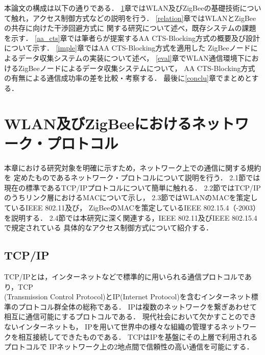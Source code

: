 \documentclass[12pt]{jreport}
\begin{document}
本論文の構成は以下の通りである．
\ref{fundamental}章ではWLAN及びZigBeeの基礎技術について触れ，アクセス制御方式などの説明を行う．
\ref{relation}章ではWLANとZigBeeの共存に向けた干渉回避方式に
関する研究について述べ，既存システムの課題を示す．
\ref{aa_cts}章では筆者らが提案するAA CTS-Blocking方式の概要及び設計について示す．
\ref{imple}章ではAA CTS-Blocking方式を適用した
ZigBeeノードによるデータ収集システムの実装について述べ，
\ref{eval}章でWLAN通信環境下におけるZigBeeノードによるデータ収集システムについて，
AA CTS-Blocking方式の有無による通信成功率の差を比較・考察する．
最後に\ref{conclu}章でまとめとする．

\chapter{WLAN及びZigBeeにおけるネットワーク・プロトコル}
\label{fundamental}
本章における研究対象を明確に示すため，ネットワーク上での通信に関する規約を
定めたものであるネットワーク・プロトコルについて説明を行う．
2.1節では現在の標準であるTCP/IPプロトコルについて簡単に触れる．
2.2節ではTCP/IPのうちリンク層におけるMACについて示し，
2.3節ではWLANのMACを策定しているIEEE 802.11及び，
ZigBeeのMACを策定しているIEEE 802.15.4（-2003）を説明する．
2.4節では本研究に深く関連する，IEEE 802.11及びIEEE 802.15.4で規定されている
具体的なアクセス制御方式について紹介する．\\

\section{TCP/IP}

TCP/IPとは，インターネットなどで標準的に用いられる通信プロトコルであり，TCP\\
(Transmission Control Protocol)とIP(Internet Protocol)を含むインターネット標準のプロトコル群全体の総称である．
IPは複数のネットワークを繋ぎあわせて相互に通信可能にするプロトコルである．
現代社会において欠かすことのできないインターネットも，
IPを用いて世界中の様々な組織の管理するネットワークを相互接続してできたものである．
TCPはIPを基盤にその上層で利用されるプロトコルで
IPネットワーク上の2地点間で信頼性の高い通信を可能にする．

\end{document}
